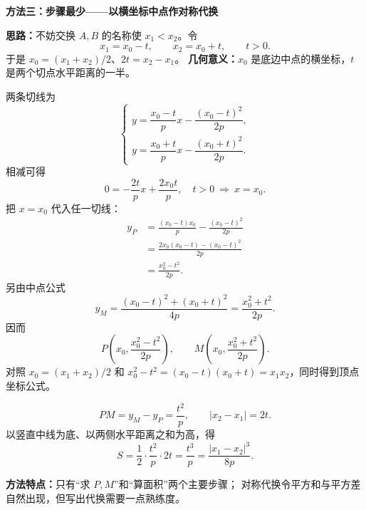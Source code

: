 \begin{proofbox}
    \medskip
    \par\noindent\begin{minipage}{\linewidth}
    \textbf{\textcolor{CProof}{方法三：步骤最少——以横坐标中点作对称代换}}

    
    \end{minipage}\par

    \textbf{思路：}不妨交换 $A,B$ 的名称使 $x_1<x_2$。令
    \[
        x_1=x_0-t,\qquad x_2=x_0+t,\qquad t>0.
    \]
    于是 $x_0=(x_1+x_2)/2$、$2t=x_2-x_1$。
    \textbf{几何意义：}$x_0$ 是底边中点的横坐标，$t$ 是两个切点水平距离的一半。

    \begin{description}[style=nextline, leftmargin=2.8em, labelsep=0.5em, itemsep=0.5em]
        \item[\textbf{第一步（用对称形式一次求出顶点与中点）：}]
        两条切线为
        \[
        \begin{cases}
            y=\dfrac{x_0-t}{p}x-\dfrac{(x_0-t)^2}{2p},\\[3pt]
            y=\dfrac{x_0+t}{p}x-\dfrac{(x_0+t)^2}{2p}.
        \end{cases}
        \]
        相减可得
        \[
            0=-\frac{2t}{p}x+\frac{2x_0t}{p},
            \quad t>0\ \Longrightarrow\ x=x_0.
        \]
        把 $x=x_0$ 代入任一切线：
        \[
        \begin{aligned}
            y_P
            &=\frac{(x_0-t)x_0}{p}-\frac{(x_0-t)^2}{2p}\\
            &=\frac{2x_0(x_0-t)-(x_0-t)^2}{2p}\\
            &=\frac{x_0^2-t^2}{2p}.
        \end{aligned}
        \]
        另由中点公式
        \[
            y_M=\frac{(x_0-t)^2+(x_0+t)^2}{4p}
            =\frac{x_0^2+t^2}{2p}.
        \]
        因而
        \[
            P\left(x_0,\frac{x_0^2-t^2}{2p}\right),\qquad
            M\left(x_0,\frac{x_0^2+t^2}{2p}\right).
        \]
        对照 $x_0=(x_1+x_2)/2$ 和
        $x_0^2-t^2=(x_0-t)(x_0+t)=x_1x_2$，同时得到顶点坐标公式。

        \item[\textbf{第二步（两个量相乘，直接出面积）：}]
        \[
            PM=y_M-y_P=\frac{t^2}{p},\qquad
            |x_2-x_1|=2t.
        \]
        以竖直中线为底、以两侧水平距离之和为高，得
        \[
            \boxed{S=\frac12\cdot\frac{t^2}{p}\cdot2t
            =\frac{t^3}{p}=\frac{|x_1-x_2|^3}{8p}}.
        \]
    \end{description}
    \textbf{方法特点：}只有“求 $P,M$”和“算面积”两个主要步骤；
    对称代换令平方和与平方差自然出现，但写出代换需要一点熟练度。


\end{proofbox}
